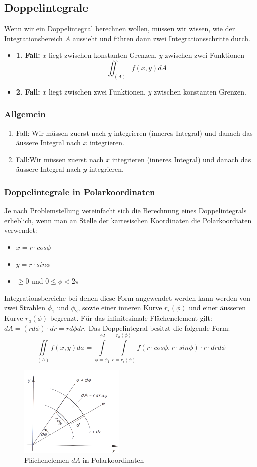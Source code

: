 \subsection{Doppelintegrale}
Wenn wir ein Doppelintegral berechnen wollen, müssen wir wissen, wie der Integrationsbereich $A$ aussieht und führen dann zwei Integrationsschritte durch.
\begin{itemize}
	\item \textbf{1. Fall:} $x$ liegt zwischen konstanten Grenzen, $y$ zwischen zwei Funktionen
	$$ \iint_{(A)} f(x,y) dA$$ 
	\item \textbf{2. Fall:} $x$ liegt zwischen zwei Funktionen, $y$ zwischen konstanten Grenzen.
\end{itemize}

\subsubsection{Allgemein}
\begin{enumerate}
	\item Fall: Wir müssen zuerst nach $y$ integrieren (inneres Integral) und danach das äussere Integral nach $x$ integrieren.
	\item Fall:Wir müssen zuerst nach $x$ integrieren (inneres Integral) und danach das äussere Integral nach $y$ integrieren.
\end{enumerate}

\subsubsection{Doppelintegrale in Polarkoordinaten}
Je nach Problemstellung vereinfacht sich die Berechnung eines Doppelintegrals erheblich, wenn man an Stelle der kartesischen Koordinaten die Polarkoordiaten verwendet:
\begin{itemize}
\item $x = r \cdot cos\phi$
\item $y = r \cdot sin\phi$
\item $ \geq 0$ und $0 \leq \phi < 2\pi$
\end{itemize}
Integrationsbereiche bei denen diese Form angewendet werden kann werden von zwei Strahlen $\phi_1$ und $\phi_2$, sowie einer inneren Kurve $r_i(\phi)$ und einer äusseren Kurve $r_a(\phi)$ begrenzt. Für das infinitesimale Flächenelement gilt: $dA = (rd\phi) \cdot dr = rd\phi dr$. Das Doppelintegral besitzt die folgende Form:
$$\iint\limits_{(A)} f(x, y) da = \int\limits_{\phi = \phi_1}^{\phi2} \int\limits_{r = r_i(\phi)}^{r_a(\phi)} f(r\cdot cos\phi, r \cdot sin \phi) \cdot r \cdot dr d\phi$$
\begin{figure}[H]
\centering
	\includegraphics[width=5cm]{Bilder/dipolar_1}
	\caption{Flächenelemen $dA$ in Polarkoordinaten}
	\label{dipolar1}
\end{figure} 

